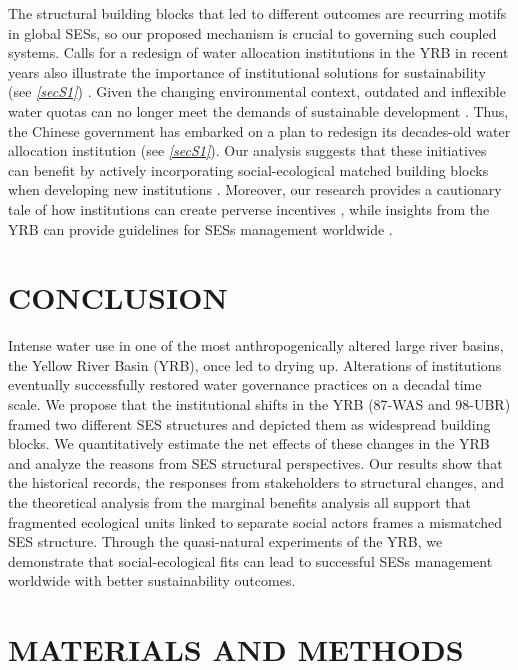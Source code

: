 \documentclass[default, sn-standardnature]{sn-jnl}
\begin{document}
The structural building blocks that led to different outcomes are recurring motifs in global SESs, so our proposed mechanism is crucial to governing such coupled systems.
Calls for a redesign of water allocation institutions in the YRB in recent years also illustrate the importance of institutional solutions for sustainability (see \textit{\ref{secS1}}) \cite{yu2019}.
Given the changing environmental context, outdated and inflexible water quotas can no longer meet the demands of sustainable development \cite{wang2019e}.
Thus, the Chinese government has embarked on a plan to redesign its decades-old water allocation institution (see \textit{\ref{secS1}}).
Our analysis suggests that these initiatives can benefit by actively incorporating social-ecological matched building blocks when developing new institutions \cite{bodin2017b}.
Moreover, our research provides a cautionary tale of how institutions can create perverse incentives \cite{hegwood2022}, while insights from the YRB can provide guidelines for SESs management worldwide \cite{muneepeerakul2017, leslie2015}.


\section{CONCLUSION}\label{sec:conclusion}

Intense water use in one of the most anthropogenically altered large river basins, the Yellow River Basin (YRB), once led to drying up.
Alterations of institutions eventually successfully restored water governance practices on a decadal time scale.
We propose that the institutional shifts in the YRB (87-WAS and 98-UBR) framed two different SES structures and depicted them as widespread building blocks.
We quantitatively estimate the net effects of these changes in the YRB and analyze the reasons from SES structural perspectives.
Our results show that the historical records, the responses from stakeholders to structural changes, and the theoretical analysis from the marginal benefits analysis all support that fragmented ecological units linked to separate social actors frames a mismatched SES structure.
Through the quasi-natural experiments of the YRB, we demonstrate that social-ecological fits can lead to successful SESs management worldwide with better sustainability outcomes.


\section{MATERIALS AND METHODS}\label{sec:methods}
\end{document}
